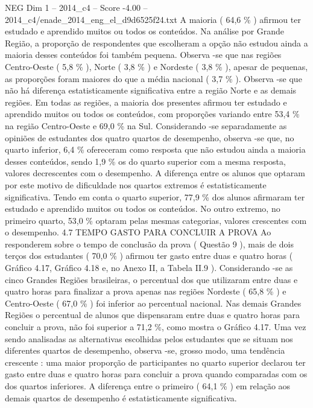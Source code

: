 \begin{textsample}{NEG Dim 1 – 2014\_c4 – Score -4.00 – 2014\_c4/enade\_2014\_eng\_el\_d9d6525f24.txt}
A maioria ( 64,6 \% ) afirmou ter estudado e aprendido muitos ou todos os conteúdos.
Na análise por Grande Região, a proporção de respondentes que escolheram a opção não estudou ainda a maioria desses conteúdos foi também pequena.
Observa -se que nas regiões Centro-Oeste ( 5,8 \% ), Norte ( 3,8 \% ) e Nordeste ( 3,8 \% ), apesar de pequenas, as proporções foram maiores do que a média nacional ( 3,7 \% ).
Observa -se que não há diferença estatisticamente significativa entre a região Norte e as demais regiões.
Em todas as regiões, a maioria dos presentes afirmou ter estudado e aprendido muitos ou todos os conteúdos, com proporções variando entre 53,4 \% na região Centro-Oeste e 69,0 \% na Sul.
Considerando -se separadamente as opiniões de estudantes dos quatro quartos de desempenho, observa -se que, no quarto inferior, 6,4 \% ofereceram como resposta que não estudou ainda a maioria desses conteúdos, sendo 1,9 \% os do quarto superior com a mesma resposta, valores decrescentes com o desempenho.
A diferença entre os alunos que optaram por este motivo de dificuldade nos quartos extremos é estatisticamente significativa.
Tendo em conta o quarto superior, 77,9 \% dos alunos afirmaram ter estudado e aprendido muitos ou todos os conteúdos.
No outro extremo, no primeiro quarto, 53,0 \% optaram pelas mesmas categorias, valores crescentes com o desempenho. 4.7 TEMPO GASTO PARA CONCLUIR A PROVA Ao responderem sobre o tempo de conclusão da prova ( Questão 9 ), mais de dois terços dos estudantes ( 70,0 \% ) afirmou ter gasto entre duas e quatro horas ( Gráfico 4.17, Gráfico 4.18 e, no Anexo II, a Tabela II.9 ).
Considerando -se as cinco Grandes Regiões brasileiras, o percentual dos que utilizaram entre duas e quatro horas para finalizar a prova apenas nas regiões Nordeste ( 65,8 \% ) e Centro-Oeste ( 67,0 \% ) foi inferior ao percentual nacional.
Nas demais Grandes Regiões o percentual de alunos que dispensaram entre duas e quatro horas para concluir a prova, não foi superior a 71,2 \%, como mostra o Gráfico 4.17.
Uma vez sendo analisadas as alternativas escolhidas pelos estudantes que se situam nos diferentes quartos de desempenho, observa -se, grosso modo, uma tendência crescente : uma maior proporção de participantes no quarto superior declarou ter gasto entre duas e quatro horas para concluir a prova quando comparadas com os dos quartos inferiores.
A diferença entre o primeiro ( 64,1 \% ) em relação aos demais quartos de desempenho é estatisticamente significativa.

\end{textsample}
